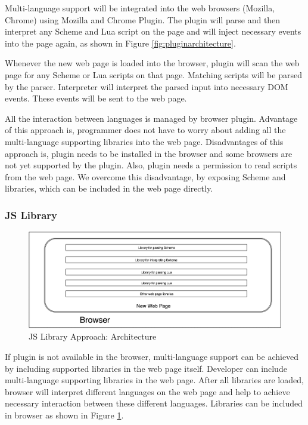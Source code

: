 Multi-language support will be integrated into the web browsers (Mozilla, Chrome) using Mozilla and Chrome Plugin. The plugin will parse and then interpret any Scheme and Lua script on the page and will inject necessary events into the page again, as shown in Figure \ref{fig:pluginarchitecture}.

Whenever the new web page is loaded into the browser, plugin will scan the web page for any Scheme or Lua scripts on that page. Matching scripts will be parsed by the parser. Interpreter will interpret the parsed input into necessary DOM events. These events will be sent to the web page. 

All the interaction between languages is managed by browser plugin. Advantage of this approach is, programmer does not have to worry about adding all the multi-language supporting libraries into the web page. Disadvantages of this approach is, plugin needs to be installed in the browser and some browsers are not yet supported by the plugin. Also, plugin needs a permission to read scripts from the web page. We overcome this disadvantage, by exposing Scheme and libraries, which can be included in the web page directly.

\subsubsection{JS Library}

\begin{figure}[h]
	\begin{center}
		\includegraphics[width=\linewidth]{./images/JSLibraryApproach.png}
	\end{center}
	\caption{JS Library Approach: Architecture}
	\label{fig:jslibraryarchitecture}
\end{figure}

If plugin is not available in the browser, multi-language support can be achieved by including supported libraries in the web page itself. Developer can include multi-language supporting libraries in the web page. After all libraries are loaded, browser will interpret different languages on the web page and help to achieve necessary interaction between these different languages. Libraries can be included in browser as shown in Figure \ref{fig:jslibraryarchitecture}.
